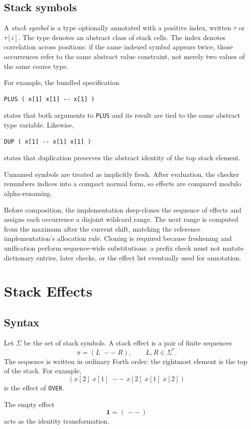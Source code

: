 \documentclass[11pt]{article}
\newcommand{\id}{\mathbf{1}}
\begin{document}
\subsection{Stack symbols}
A \emph{stack symbol} is a type optionally annotated with a positive index, written $\tau$ or $\tau[i]$. The type denotes an abstract class of stack cells. The index denotes correlation across positions: if the same indexed symbol appears twice, those occurrences refer to the same abstract value constraint, not merely two values of the same coarse type.

For example, the bundled specification
\begin{lstlisting}
PLUS ( x[1] x[1] -- x[1] )
\end{lstlisting}
states that both arguments to \texttt{PLUS} and its result are tied to the same abstract type variable. Likewise,
\begin{lstlisting}
DUP ( x[1] -- x[1] x[1] )
\end{lstlisting}
states that duplication preserves the abstract identity of the top stack element.

Unnamed symbols are treated as implicitly fresh. After evaluation, the checker renumbers indices into a compact normal form, so effects are compared modulo alpha-renaming.

Before composition, the implementation deep-clones the sequence of effects and
assigns each occurrence a disjoint wildcard range. The next range is computed
from the maximum after the current shift, matching the reference implementation's
allocation rule. Cloning is required because freshening and unification perform
sequence-wide substitutions: a prefix check must not mutate dictionary entries,
later checks, or the effect list eventually used for annotation.

\section{Stack Effects}
\subsection{Syntax}
Let $\Sigma$ be the set of stack symbols. A stack effect is a pair of finite sequences
\[
\pi = (L \; -- \; R), \qquad L,R \in \Sigma^\ast.
\]
The sequence is written in ordinary Forth order: the rightmost element is the top of the stack. For example,
\[
(x[2]\;x[1]\; -- \; x[2]\;x[1]\;x[2])
\]
is the effect of \texttt{OVER}.

The empty effect
\[
\id = (\, -- \,)
\]
acts as the identity transformation.
\end{document}
